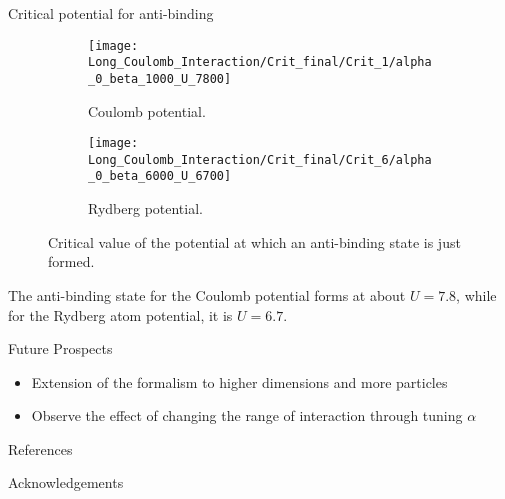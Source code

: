 \documentclass[final]{beamer}
\newlength{\onecolwid}
\begin{document}
\begin{frame}[t]
\begin{columns}[t]
\begin{column}{\onecolwid}
\begin{block}{Critical potential for anti-binding}
\begin{figure}[h!]
	\centering
	\begin{subfigure}{0.4\linewidth}
		\texttt{[image: Long\_Coulomb\_Interaction/Crit\_final/Crit\_1/alpha\_0\_beta\_1000\_U\_7800]}
		\caption{Coulomb potential.}
		\label{fig:alpha0beta1000u7800}
	\end{subfigure}
	\begin{subfigure}{0.4\linewidth}
		\texttt{[image: Long\_Coulomb\_Interaction/Crit\_final/Crit\_6/alpha\_0\_beta\_6000\_U\_6700]}
		\caption{Rydberg potential.}
		\label{fig:alpha0beta6000u6700}
	\end{subfigure}
	\caption{Critical value of the potential at which an anti-binding state is just formed.}
\end{figure}
The anti-binding state for the Coulomb potential forms at about $U = 7.8$, while for the Rydberg atom potential, it is $U = 6.7$.
\end{block}



\begin{alertblock}{Future Prospects}
	
	\begin{itemize}
		\item Extension of the formalism to higher dimensions and more particles
		\item Observe the effect of changing the range of interaction through tuning $\alpha$
	\end{itemize}
	
\end{alertblock}

\begin{block}{References}
	
	\nocite{*} %
	\small{
		\vspace{0.75in}}
	
\end{block}
\vspace{-20mm}
\begin{block}{Acknowledgements}
	\small{} \\
	

\end{block}
\end{column}
\end{columns}
\end{frame}
\end{document}
